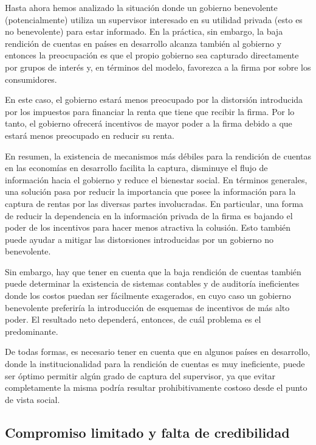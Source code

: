 \documentclass[
  12pt,
  spanish,
]{book}
\begin{document}
Hasta ahora hemos analizado la situación donde un gobierno benevolente
(potencialmente) utiliza un supervisor interesado en su utilidad privada
(esto es no benevolente) para estar informado. En la práctica, sin
embargo, la baja rendición de cuentas en países en desarrollo alcanza
también al gobierno y entonces la preocupación es que el propio gobierno
sea capturado directamente por grupos de interés y, en términos del
modelo, favorezca a la firma por sobre los consumidores.

En este caso, el gobierno estará menos preocupado por la distorsión
introducida por los impuestos para financiar la renta que tiene que
recibir la firma. Por lo tanto, el gobierno ofrecerá incentivos de mayor
poder a la firma debido a que estará menos preocupado en reducir su
renta.

En resumen, la existencia de mecanismos más débiles para la rendición de
cuentas en las economías en desarrollo facilita la captura, disminuye el
flujo de información hacia el gobierno y reduce el bienestar social. En
términos generales, una solución pasa por reducir la importancia que
posee la información para la captura de rentas por las diversas partes
involucradas. En particular, una forma de reducir la dependencia en la
información privada de la firma es bajando el poder de los incentivos
para hacer menos atractiva la colusión. Esto también puede ayudar a
mitigar las distorsiones introducidas por un gobierno no benevolente.

Sin embargo, hay que tener en cuenta que la baja rendición de cuentas
también puede determinar la existencia de sistemas contables y de
auditoría ineficientes donde los costos puedan ser fácilmente
exagerados, en cuyo caso un gobierno benevolente preferiría la
introducción de esquemas de incentivos de más alto poder. El resultado
neto dependerá, entonces, de cuál problema es el predominante.

De todas formas, es necesario tener en cuenta que en algunos países en
desarrollo, donde la institucionalidad para la rendición de cuentas es
muy ineficiente, puede ser óptimo permitir algún grado de captura del
supervisor, ya que evitar completamente la misma podría resultar
prohibitivamente costoso desde el punto de vista social.

\hypertarget{credibilidad}{%
\subsection{Compromiso limitado y falta de
credibilidad}\label{credibilidad}}
\end{document}
